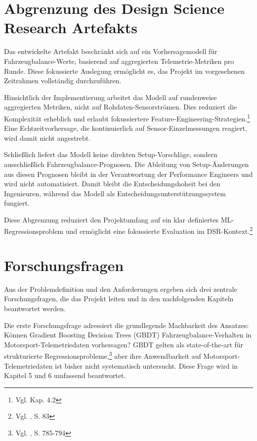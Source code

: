 \section{Abgrenzung des Design Science Research Artefakts}

Das entwickelte Artefakt beschränkt sich auf ein Vorhersagemodell für Fahrzeugbalance-Werte, basierend auf aggregierten Telemetrie-Metriken pro Runde. Diese fokussierte Auslegung ermöglicht es, das Projekt im vorgesehenen Zeitrahmen vollständig durchzuführen.

Hinsichtlich der Implementierung arbeitet das Modell auf rundenweise aggregierten Metriken, nicht auf Rohdaten-Sensorströmen. Dies reduziert die Komplexität erheblich und erlaubt fokussiertere Feature-Engineering-Strategien.\footnote{Vgl. Kap. 4.2} Eine Echtzeitvorhersage, die kontinuierlich auf Sensor-Einzelmessungen reagiert, wird damit nicht angestrebt.

Schließlich liefert das Modell keine direkten Setup-Vorschläge, sondern ausschließlich Fahrzeug\-balance-Prognosen. Die Ableitung von Setup-Änderungen aus diesen Prognosen bleibt in der Verantwortung der Performance Engineers und wird nicht automatisiert. Damit bleibt die Entscheidungshoheit bei den Ingenieuren, während das Modell als Entscheidungsunterstützungssystem fungiert.

Diese Abgrenzung reduziert den Projektumfang auf ein klar definiertes \ac{ML}-Regressionsproblem und ermöglicht eine fokussierte Evaluation im \ac{DSR}-Kontext.\footnote{Vgl. \cite{Hevner2004}, S. 83}



\section{Forschungsfragen}

Aus der Problemdefinition und den Anforderungen ergeben sich drei zentrale Forschungsfragen, die das Projekt leiten und in den nachfolgenden Kapiteln beantwortet werden.

Die erste Forschungsfrage adressiert die grundlegende Machbarkeit des Ansatzes: Können Gradient Boosting Decision Trees (GBDT) Fahrzeugbalance-Verhalten in Motorsport-Telemetriedaten vorhersagen? GBDT gelten als state-of-the-art für strukturierte Regressionsprobleme,\footnote{Vgl. \cite{Chen2016}, S. 785-794} aber ihre Anwendbarkeit auf Motorsport-Telemetriedaten ist bisher nicht systematisch untersucht. Diese Frage wird in Kapitel 5 und 6 umfassend beantwortet.

